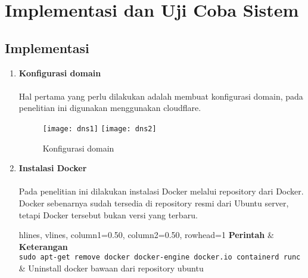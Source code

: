 \documentclass[./bab_4.tex]{subfiles}
\begin{document}
\section{Implementasi dan Uji Coba Sistem}

\subsection{Implementasi}
  \begin{enumerate}[label=\textbf{\arabic*.}]
    \item \textbf{Konfigurasi domain}
      \paragraph*{} Hal pertama yang perlu dilakukan adalah
      membuat konfigurasi domain, pada penelitian ini
      digunakan menggunakan cloudflare. 
      \begin{figure}[!ht]
        \begin{center}
          \texttt{[image: dns1]}
          \texttt{[image: dns2]}
        \end{center}
        \caption{Konfigurasi domain}
        \label{konfdomain}
      \end{figure}
      
    \item \textbf{Instalasi Docker}
      \paragraph*{} Pada penelitian ini dilakukan
      instalasi Docker melalui repository dari Docker.
      Docker sebenarnya sudah tersedia di repository
      resmi dari Ubuntu server, tetapi Docker tersebut bukan
      versi yang terbaru.
      \begin{longtblr}[caption= {Langkah instalasi Docker}]{hlines, vlines,
        column{1}={0.50\linewidth}, column{2}={0.50\linewidth}, rowhead=1} 
      \textbf{Perintah}   & \textbf{Keterangan}\\

        \texttt{sudo apt-get remove docker docker-engine docker.io
        containerd runc} & {Uninstall docker bawaan dari
        repository ubuntu}\\


\end{longtblr}
\end{enumerate}
\end{document}
